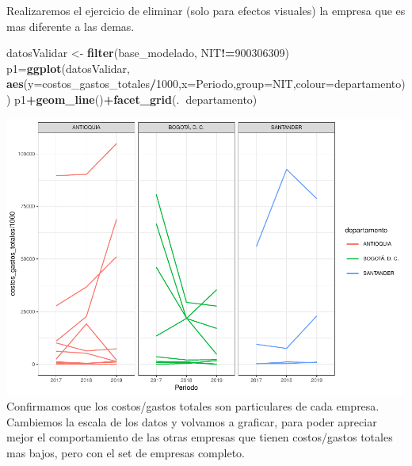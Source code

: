 \documentclass[
  11pt,
]{article}
\newenvironment{Shaded}{\begin{snugshade}}{\end{snugshade}}
\newcommand{\DataTypeTok}[1]{\textcolor[rgb]{0.13,0.29,0.53}{#1}}
\newcommand{\DecValTok}[1]{\textcolor[rgb]{0.00,0.00,0.81}{#1}}
\newcommand{\KeywordTok}[1]{\textcolor[rgb]{0.13,0.29,0.53}{\textbf{#1}}}
\newcommand{\NormalTok}[1]{#1}
\newcommand{\OperatorTok}[1]{\textcolor[rgb]{0.81,0.36,0.00}{\textbf{#1}}}
\newcommand{\StringTok}[1]{\textcolor[rgb]{0.31,0.60,0.02}{#1}}
\begin{document}
Realizaremos el ejercicio de eliminar (solo para efectos visuales) la
empresa que es mas diferente a las demas.

\begin{Shaded}
\begin{Highlighting}[]
\NormalTok{datosValidar <-}\StringTok{ }\KeywordTok{filter}\NormalTok{(base_modelado, NIT}\OperatorTok{!=}\DecValTok{900306309}\NormalTok{)}
\NormalTok{p1=}\KeywordTok{ggplot}\NormalTok{(datosValidar, }\KeywordTok{aes}\NormalTok{(}\DataTypeTok{y=}\NormalTok{costos_gastos_totales}\OperatorTok{/}\DecValTok{1000}\NormalTok{,}\DataTypeTok{x=}\NormalTok{Periodo,}\DataTypeTok{group=}\NormalTok{NIT,}\DataTypeTok{colour=}\NormalTok{departamento))}
\NormalTok{p1}\OperatorTok{+}\KeywordTok{geom_line}\NormalTok{()}\OperatorTok{+}\KeywordTok{facet_grid}\NormalTok{(.}\OperatorTok{~}\NormalTok{departamento)}
\end{Highlighting}
\end{Shaded}

\includegraphics{index_files/figure-latex/unnamed-chunk-35-1.pdf}
Confirmamos que los costos/gastos totales son particulares de cada
empresa. Cambiemos la escala de los datos y volvamos a graficar, para
poder apreciar mejor el comportamiento de las otras empresas que tienen
costos/gastos totales mas bajos, pero con el set de empresas completo.
\end{document}
